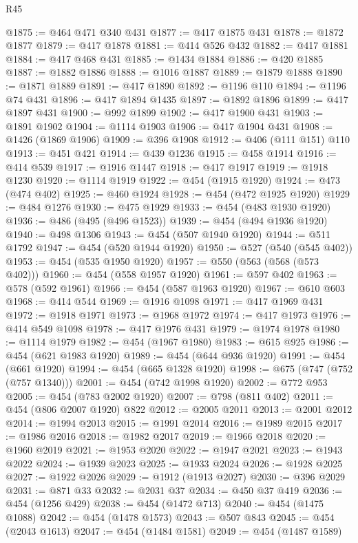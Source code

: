 \begin{lexlean}{R45}
\begin{coremodule}
@1875 := @464 @471 @340 @431
@1877 := @417 @1875 @431
@1878 := @1872 @1877
@1879 := @417 @1878
@1881 := @414 @526 @432
@1882 := @417 @1881
@1884 := @417 @468 @431
@1885 := @1434 @1884
@1886 := @420 @1885
@1887 := @1882 @1886
@1888 := @1016 @1887
@1889 := @1879 @1888
@1890 := @1871 @1889
@1891 := @417 @1890
@1892 := @1196 @110
@1894 := @1196 @74 @431
@1896 := @417 @1894 @1435
@1897 := @1892 @1896
@1899 := @417 @1897 @431
@1900 := @992 @1899
@1902 := @417 @1900 @431
@1903 := @1891 @1902
@1904 := @1114 @1903
@1906 := @417 @1904 @431
@1908 := @1426 (@1869 @1906)
@1909 := @396 @1908
@1912 := @406 (@111 @151) @110
@1913 := @451 @421
@1914 := @439 @1236
@1915 := @458 @1914
@1916 := @414 @539
@1917 := @1916 @1447
@1918 := @417 @1917
@1919 := @1918 @1230
@1920 := @1114 @1919
@1922 := @454 (@1915 @1920)
@1924 := @473 (@474 @402)
@1925 := @460 @1924
@1928 := @454 (@472 @1925 @1920)
@1929 := @484 @1276
@1930 := @475 @1929
@1933 := @454 (@483 @1930 @1920)
@1936 := @486 (@495 (@496 @1523))
@1939 := @454 (@494 @1936 @1920)
@1940 := @498 @1306
@1943 := @454 (@507 @1940 @1920)
@1944 := @511 @1792
@1947 := @454 (@520 @1944 @1920)
@1950 := @527 (@540 (@545 @402))
@1953 := @454 (@535 @1950 @1920)
@1957 := @550 (@563 (@568 (@573 @402)))
@1960 := @454 (@558 @1957 @1920)
@1961 := @597 @402
@1963 := @578 (@592 @1961)
@1966 := @454 (@587 @1963 @1920)
@1967 := @610 @603
@1968 := @414 @544
@1969 := @1916 @1098
@1971 := @417 @1969 @431
@1972 := @1918 @1971
@1973 := @1968 @1972
@1974 := @417 @1973
@1976 := @414 @549 @1098
@1978 := @417 @1976 @431
@1979 := @1974 @1978
@1980 := @1114 @1979
@1982 := @454 (@1967 @1980)
@1983 := @615 @925
@1986 := @454 (@621 @1983 @1920)
@1989 := @454 (@644 @936 @1920)
@1991 := @454 (@661 @1920)
@1994 := @454 (@665 @1328 @1920)
@1998 := @675 (@747 (@752 (@757 @1340)))
@2001 := @454 (@742 @1998 @1920)
@2002 := @772 @953
@2005 := @454 (@783 @2002 @1920)
@2007 := @798 (@811 @402)
@2011 := @454 (@806 @2007 @1920) @822
@2012 := @2005 @2011
@2013 := @2001 @2012
@2014 := @1994 @2013
@2015 := @1991 @2014
@2016 := @1989 @2015
@2017 := @1986 @2016
@2018 := @1982 @2017
@2019 := @1966 @2018
@2020 := @1960 @2019
@2021 := @1953 @2020
@2022 := @1947 @2021
@2023 := @1943 @2022
@2024 := @1939 @2023
@2025 := @1933 @2024
@2026 := @1928 @2025
@2027 := @1922 @2026
@2029 := @1912 (@1913 @2027)
@2030 := @396 @2029
@2031 := @871 @33
@2032 := @2031 @37
@2034 := @450 @37 @419
@2036 := @454 (@1256 @429)
@2038 := @454 (@1472 @713)
@2040 := @454 (@1475 @1088)
@2042 := @454 (@1478 @1573)
@2043 := @507 @843
@2045 := @454 (@2043 @1613)
@2047 := @454 (@1484 @1581)
@2049 := @454 (@1487 @1589)

\end{coremodule}
\end{lexlean}
